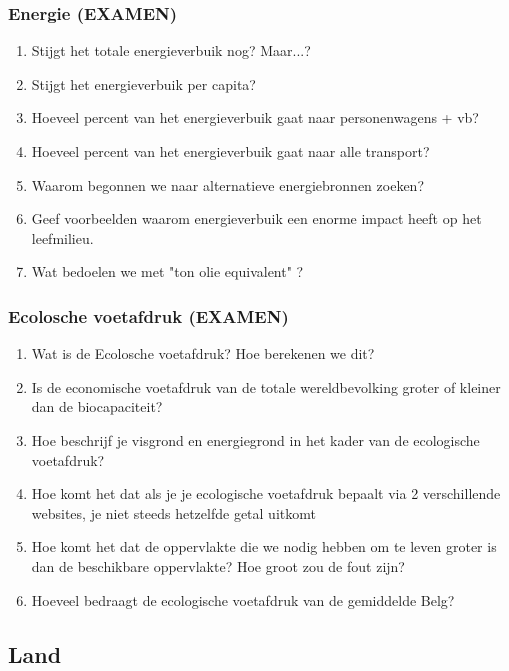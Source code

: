 \documentclass[12pt]{article}
\begin{document}
    \subsubsection{Energie \textbf{(EXAMEN)}}
    \begin{enumerate}
        \item Stijgt het totale energieverbuik nog? Maar...? 
        \item Stijgt het energieverbuik per capita?
        \item Hoeveel percent van het energieverbuik gaat naar personenwagens + vb?
        \item Hoeveel percent van het energieverbuik gaat naar alle transport?
        \item Waarom begonnen we naar alternatieve energiebronnen zoeken?
        \item Geef voorbeelden waarom energieverbuik een enorme impact heeft op het leefmilieu.
        \item Wat bedoelen we met "ton olie equivalent" ?
    \end{enumerate}

    \subsubsection{Ecolosche voetafdruk \textbf{(EXAMEN)}}
    \begin{enumerate}
        \item Wat is de Ecolosche voetafdruk? Hoe berekenen we dit?
        \item Is de economische voetafdruk van de totale wereldbevolking groter of kleiner dan de biocapaciteit?
        \item Hoe beschrijf je visgrond en energiegrond in het kader van de ecologische voetafdruk?
        \item Hoe komt het dat als je je ecologische voetafdruk bepaalt via 2 verschillende websites, je niet steeds hetzelfde getal uitkomt
        \item Hoe komt het dat de oppervlakte die we nodig hebben om te leven groter is dan de beschikbare oppervlakte? Hoe groot zou de fout zijn?
        \item Hoeveel bedraagt de ecologische voetafdruk van de gemiddelde Belg?
    \end{enumerate}
    

    \subsection{Land}
\end{document}
